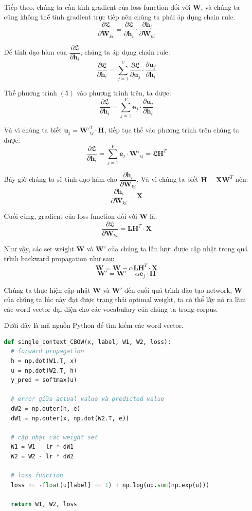 \documentclass[12pt]{article}
\begin{document}
\indent Tiếp theo, chúng ta cần tính gradient của loss function đối với $\boldsymbol{W}$, và chúng ta cũng không thể tính gradient trực tiếp nên chúng ta phải áp dụng chain rule.
$$\dfrac{\partial \mathfrak{L}}{\partial \boldsymbol{W}_{ki}} = \dfrac{\partial \mathfrak{L}}{\partial \boldsymbol{h}_i} \cdot \dfrac{\partial \boldsymbol{h}_i}{\partial \boldsymbol{W}_{ki}}$$

\indent Để tính đạo hàm của $\dfrac{\partial \mathfrak{L}}{\partial \boldsymbol{h}_i}$, chúng ta áp dụng chain rule:
$$\dfrac{\partial \mathfrak{L}}{\partial \boldsymbol{h}_i} = \sum_{j=1}^V \dfrac{\partial \mathfrak{L}}{\partial \boldsymbol{u}_j} \cdot \dfrac{\partial \boldsymbol{u}_j}{\partial \boldsymbol{h}_i}$$

\indent Thế phương trình $(5)$ vào phương trình trên, ta được:
$$\dfrac{\partial \mathfrak{L}}{\partial \boldsymbol{h}_i} = \sum_{j=1}^V \boldsymbol{e}_j \cdot \dfrac{\partial \boldsymbol{u}_j}{\partial \boldsymbol{h}_i}$$

\indent Và vì chúng ta biết $\boldsymbol{u}_j = \boldsymbol{W'}_{ij}^T \cdot \boldsymbol{H}$, tiếp tục thế vào phương trình trên chúng ta được:
$$\dfrac{\partial \mathfrak{L}}{\partial \boldsymbol{h}_i} = \sum_{j=1}^V \boldsymbol{e}_j \cdot \boldsymbol{W'}_{ij} = \mathfrak{L}\boldsymbol{H}^T$$

\indent Bây giờ chúng ta sẽ tính đạo hàm cho $\dfrac{\partial \boldsymbol{h}_i}{\partial \boldsymbol{W}_{ki}}$. Và vì chúng ta biết $\boldsymbol{H} = \boldsymbol{XW}^T$ nên:
$$\dfrac{\partial \boldsymbol{h}_i}{\partial \boldsymbol{W}_{ki}} = \boldsymbol{X}$$

\indent Cuối cùng, gradient của loss function đối với $\boldsymbol{W}$ là:
$$\dfrac{\partial \mathfrak{L}}{\partial \boldsymbol{W}_{ki}} = \boldsymbol{LH}^T \cdot \boldsymbol{X}$$

\indent Như vậy, các set weight $\boldsymbol{W}$ và $\boldsymbol{W'}$ của chúng ta lần lượt được cập nhật trong quá trình backward propagation như sau:
$$\boldsymbol{W} = \boldsymbol{W} - \alpha \boldsymbol{LH}^T \cdot \boldsymbol{X}$$
$$\boldsymbol{W'} = \boldsymbol{W'} - \alpha \boldsymbol{e}_j \cdot \boldsymbol{H}$$

\indent Chúng ta thực hiện cập nhật $\boldsymbol{W}$ và $\boldsymbol{W'}$ đến cuối quá trình đào tạo network, $\boldsymbol{W}$ của chúng ta lúc này đạt được trạng thái optimal weight, ta có thể lấy nó ra làm các word vector đại diện cho các vocabulary của chúng ta trong corpus.

\indent Dưới đây là mã nguồn Python để tìm kiếm các word vector.
\begin{lstlisting}[language=python]
def single_context_CBOW(x, label, W1, W2, loss):
  # forward propagation
  h = np.dot(W1.T, x)
  u = np.dot(W2.T, h)
  y_pred = softmax(u)

  # error giữa actual value và predicted value
  dW2 = np.outer(h, e)
  dW1 = np.outer(x, np.dot(W2.T, e))

  # cập nhật các weight set
  W1 = W1 - lr * dW1
  W2 = W2 - lr * dW2

  # loss function
  loss += -float(u[label] == 1) + np.log(np.sum(np.exp(u)))

  return W1, W2, loss
\end{lstlisting}
\end{document}
